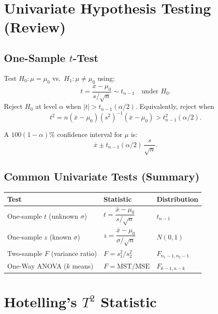 \documentclass[12pt, a4paper]{article}
\newcommand{\xbar}{\bar{x}}
\begin{document}
\section{Univariate Hypothesis Testing (Review)}

\subsection{One-Sample $t$-Test}

Test $H_0: \mu = \mu_0$ vs.\ $H_1: \mu \neq \mu_0$ using:
\[
  t = \frac{\xbar - \mu_0}{s/\sqrt{n}} \sim t_{n-1} \quad\text{under }H_0.
\]
Reject $H_0$ at level $\alpha$ when $|t| > t_{n-1}(\alpha/2)$. Equivalently, reject when
\[
  t^2 = n(\xbar-\mu_0)(s^2)^{-1}(\xbar-\mu_0) > t_{n-1}^2(\alpha/2).
\]

A $100(1-\alpha)\%$ confidence interval for $\mu$ is:
\[
  \xbar \pm t_{n-1}(\alpha/2)\,\frac{s}{\sqrt{n}}.
\]

\subsection{Common Univariate Tests (Summary)}

\begin{center}
\begin{tabular}{lll}
\toprule
\textbf{Test} & \textbf{Statistic} & \textbf{Distribution} \\
\midrule
One-sample $t$ (unknown $\sigma$) & $t = \dfrac{\xbar-\mu_0}{s/\sqrt{n}}$ & $t_{n-1}$ \\[8pt]
One-sample $z$ (known $\sigma$)   & $z = \dfrac{\xbar-\mu_0}{\sigma/\sqrt{n}}$ & $N(0,1)$ \\[8pt]
Two-sample $F$ (variance ratio)   & $F = s_1^2/s_2^2$ & $F_{n_1-1,n_2-1}$ \\[8pt]
One-Way ANOVA ($k$ means)         & $F = \text{MST}/\text{MSE}$ & $F_{k-1,n-k}$ \\
\bottomrule
\end{tabular}
\end{center}

\section{Hotelling's $T^2$ Statistic}
\end{document}
